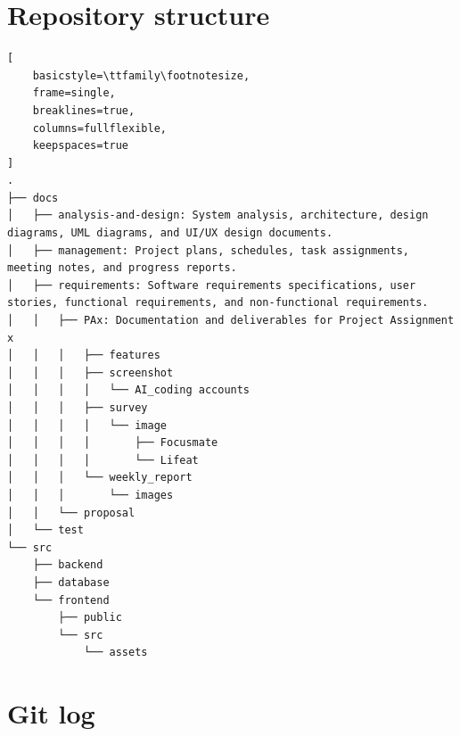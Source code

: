 
\section{Repository structure}
\begin{lstlisting}[
    basicstyle=\ttfamily\footnotesize,
    frame=single,
    breaklines=true,
    columns=fullflexible,
    keepspaces=true
]
.
├── docs
│   ├── analysis-and-design: System analysis, architecture, design diagrams, UML diagrams, and UI/UX design documents.
│   ├── management: Project plans, schedules, task assignments, meeting notes, and progress reports.
│   ├── requirements: Software requirements specifications, user stories, functional requirements, and non-functional requirements.
│   │   ├── PAx: Documentation and deliverables for Project Assignment x
│   │   │   ├── features
│   │   │   ├── screenshot
│   │   │   │   └── AI_coding accounts
│   │   │   ├── survey
│   │   │   │   └── image
│   │   │   │       ├── Focusmate
│   │   │   │       └── Lifeat
│   │   │   └── weekly_report
│   │   │       └── images
│   │   └── proposal
│   └── test
└── src
    ├── backend
    ├── database
    └── frontend
        ├── public
        └── src
            └── assets
\end{lstlisting}
\section{Git log}

